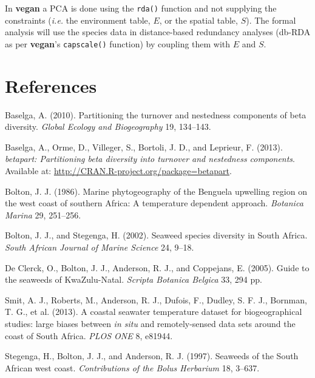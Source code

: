 \documentclass[10pt,a4,]{article}
\newlength{\cslhangindent}
\newenvironment{cslreferences}%
  {\setlength{\parindent}{0pt}%
  \everypar{\setlength{\hangindent}{\cslhangindent}}\ignorespaces}%
  {\par}
\begin{document}
In \textbf{vegan} a PCA is done using the \texttt{rda()} function and
not supplying the constraints (\emph{i.e.} the environment table, \(E\),
or the spatial table, \(S\)). The formal analysis will use the species
data in distance-based redundancy analyses (db-RDA as per
\textbf{vegan}'s \texttt{capscale()} function) by coupling them with
\(E\) and \(S\).

\section{References}

\hypertarget{refs}{}
\begin{cslreferences}
\leavevmode\hypertarget{ref-Baselga2010}{}%
Baselga, A. (2010). Partitioning the turnover and nestedness components
of beta diversity. \emph{Global Ecology and Biogeography} 19, 134--143.

\leavevmode\hypertarget{ref-Baselga2013}{}%
Baselga, A., Orme, D., Villeger, S., Bortoli, J. D., and Leprieur, F.
(2013). \emph{betapart: Partitioning beta diversity into turnover and
nestedness components}. Available at:
\url{http://CRAN.R-project.org/package=betapart}.

\leavevmode\hypertarget{ref-Bolton1986}{}%
Bolton, J. J. (1986). Marine phytogeography of the Benguela upwelling
region on the west coast of southern Africa: A temperature dependent
approach. \emph{Botanica Marina} 29, 251--256.

\leavevmode\hypertarget{ref-Bolton2002}{}%
Bolton, J. J., and Stegenga, H. (2002). Seaweed species diversity in
South Africa. \emph{South African Journal of Marine Science} 24, 9--18.

\leavevmode\hypertarget{ref-DeClerck2005}{}%
De Clerck, O., Bolton, J. J., Anderson, R. J., and Coppejans, E. (2005).
Guide to the seaweeds of KwaZulu-Natal. \emph{Scripta Botanica Belgica}
33, 294 pp.

\leavevmode\hypertarget{ref-Smit2013}{}%
Smit, A. J., Roberts, M., Anderson, R. J., Dufois, F., Dudley, S. F. J.,
Bornman, T. G., et al. (2013). A coastal seawater temperature dataset
for biogeographical studies: large biases between \emph{in situ} and
remotely-sensed data sets around the coast of South Africa. \emph{PLOS
ONE} 8, e81944.

\leavevmode\hypertarget{ref-Stegenga1997}{}%
Stegenga, H., Bolton, J. J., and Anderson, R. J. (1997). Seaweeds of the
South African west coast. \emph{Contributions of the Bolus Herbarium}
18, 3--637.
\end{cslreferences}
\end{document}
